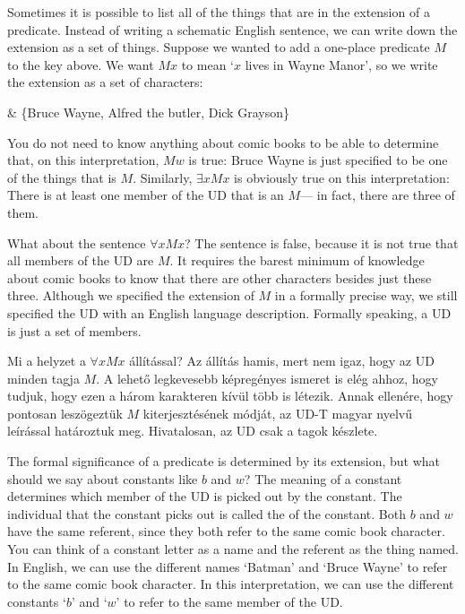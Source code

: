 Sometimes it is possible to list all of the things that are in the extension of a predicate. Instead of writing a schematic English sentence, we can write down the extension as a set of things. Suppose we wanted to add a one-place predicate $M$ to the key above. We want $Mx$ to mean `$x$ lives in Wayne Manor', so we write the extension as a set of characters:
\begin{partialmodel}
	 & \{Bruce Wayne, Alfred the butler, Dick Grayson\}
\end{partialmodel}
You do not need to know anything about comic books to be able to determine that, on this interpretation, $Mw$ is true: Bruce Wayne is just specified to be one of the things that is $M$. Similarly, $\exists x Mx$ is obviously true on this interpretation: There is at least one member of the UD that is an $M$--- in fact, there are three of them.



What about the sentence $\forall x  Mx$? The sentence is false, because it is not true that all members of the UD are $M$. It requires the barest minimum of knowledge about comic books to know that there are other characters besides just these three. Although we specified the extension of $M$ in a formally precise way, we still specified the UD with an English language description. Formally speaking, a UD is just a set of members.

Mi a helyzet a $\forall x  Mx$ állítással? Az állítás hamis, mert nem igaz, hogy az UD minden tagja $M$. A lehető legkevesebb képregényes ismeret is elég ahhoz, hogy tudjuk, hogy ezen a három karakteren kívül több is létezik. Annak ellenére, hogy pontosan leszögeztük $M$ kiterjesztésének módját, az UD-T magyar nyelvű leírással határoztuk meg. Hivatalosan, az UD csak a tagok készlete.

The formal significance of a predicate is determined by its extension, but what should we say about constants like $b$ and $w$? The meaning of a constant determines which member of the UD is picked out by the constant. The individual that the constant picks out is called the  of the constant. Both $b$ and $w$ have the same referent, since they both refer to the same comic book character. You can think of a constant letter as a name and the referent as the thing named. In English, we can use the different names `Batman' and `Bruce Wayne' to refer to the same comic book character. In this interpretation, we can use the different constants `$b$' and `$w$' to refer to the same member of the UD.

